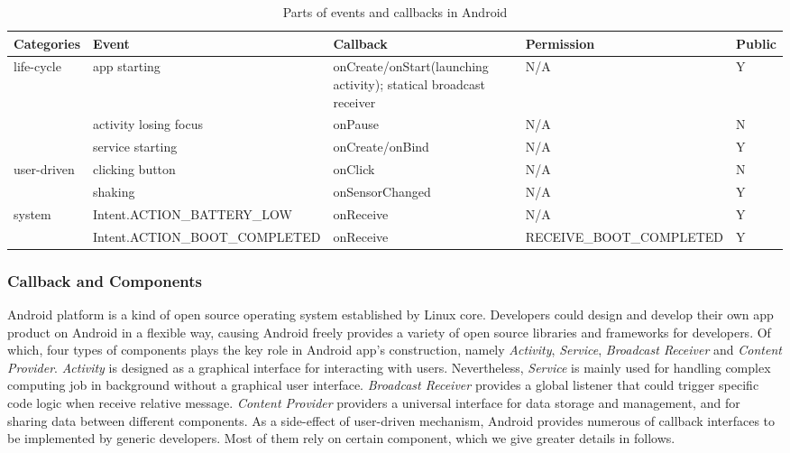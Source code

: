\documentclass{sig-alternate-05-2015}
\begin{document}
\begin{table}[t]
\centering
 \caption{\label{tab:test}Parts of events and callbacks in Android}
 \begin{tabularx}{\linewidth}{XXXXX} 
  \toprule
  Categories & Event & Callback & Permission & Public \\
  \midrule
  life-cycle & app starting & onCreate/onStart(launching activity); statical broadcast receiver & N/A & Y\\
             & activity losing focus & onPause & N/A & N\\
             & service starting & onCreate/onBind & N/A & Y\\
             
  user-driven & clicking button & onClick & N/A & N\\
              & shaking & onSensorChanged & N/A & Y\\
              
  system  & Intent.ACTION\_BATTERY\_LOW & onReceive & N/A & Y \\
          & Intent.ACTION\_BOOT\_COMPLETED & onReceive & RECEIVE\_BOOT\_COMPLETED & Y \\
  
  \bottomrule
 \end{tabularx}
\end{table}

\subsubsection{Callback and Components}
Android platform is a kind of open source operating system established by Linux core. Developers could design and develop their own app product on Android in a flexible way, causing Android freely provides a variety of open source libraries and frameworks for developers. Of which, four types of components plays the key role in Android app's construction, namely \textit{Activity}, \textit{Service}, \textit{Broadcast Receiver} and \textit{Content Provider}. \textit{Activity} is designed as a graphical interface for interacting with users. Nevertheless, \textit{Service} is mainly used for handling complex computing job in background without a graphical user interface. \textit{Broadcast Receiver} provides a global listener that could trigger specific code logic when receive relative message. \textit{Content Provider} providers a universal interface for data storage and management, and for sharing data between different components. As a side-effect of user-driven mechanism, Android provides numerous of callback interfaces to be implemented by generic developers. Most of them rely on certain component, which we give greater details in follows.
\end{document}
